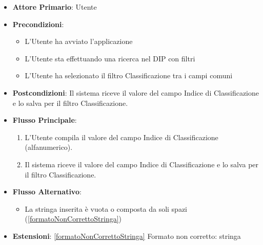 \label{compilaValoreFiltroIndiceDiClassificazione}
\begin{itemize}
      \item \textbf{Attore Primario}: Utente
      \item \textbf{Precondizioni}: 
      \begin{itemize}
            \item L'Utente ha avviato l'applicazione
            \item L'Utente sta effettuando una ricerca nel DIP con filtri
            \item L'Utente ha selezionato il filtro Classificazione tra i campi comuni
      \end{itemize}
      \item \textbf{Postcondizioni}: Il sistema riceve il valore del campo Indice di Classificazione e lo salva per il filtro Classificazione.
      \item \textbf{Flusso Principale}:
      \begin{enumerate}
            \item L'Utente compila il valore del campo Indice di Classificazione (alfanumerico).
            \item Il sistema riceve il valore del campo Indice di Classificazione e lo salva per il filtro Classificazione.
      \end{enumerate}
      \item \textbf{Flusso Alternativo}:
      \begin{itemize}
            \item La stringa inserita è vuota o composta da soli spazi (\ref{formatoNonCorrettoStringa})
      \end{itemize}
      \item \textbf{Estensioni}: \ref{formatoNonCorrettoStringa} Formato non corretto: stringa
\end{itemize}

